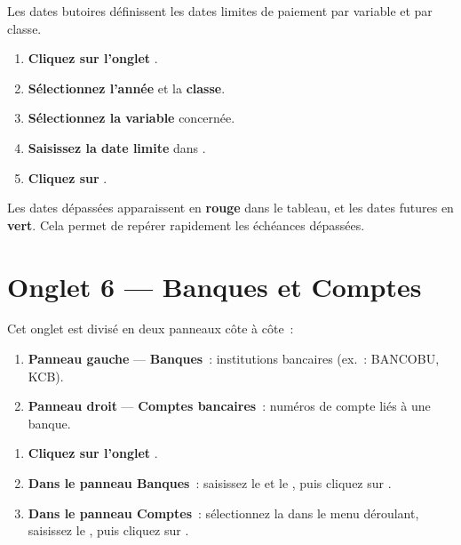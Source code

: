 Les dates butoires d\'efinissent les dates limites de paiement par variable et par classe.

\begin{etape}[title=Proc\'edure : D\'efinir une date butoire]
\begin{enumerate}[leftmargin=1.5cm,label=\textbf{\arabic*.},itemsep=10pt]
  \item \textbf{Cliquez sur l'onglet} .
  \item \textbf{S\'electionnez l'ann\'ee} et la \textbf{classe}.
  \item \textbf{S\'electionnez la variable} concern\'ee.
  \item \textbf{Saisissez la date limite} dans .
  \item \textbf{Cliquez sur} .
\end{enumerate}
\end{etape}

\begin{info}
Les dates d\'epass\'ees apparaissent en \textcolor{rose}{\textbf{rouge}} dans le tableau, et les dates futures en \textcolor{emerald}{\textbf{vert}}. Cela permet de rep\'erer rapidement les \'ech\'eances d\'epass\'ees.
\end{info}

\section{Onglet 6 --- Banques et Comptes}

Cet onglet est divis\'e en deux panneaux c\^ote \`a c\^ote~:

\begin{enumerate}[leftmargin=1.2cm]
  \item \textbf{Panneau gauche} --- \textbf{Banques}~: institutions bancaires (ex.\ : BANCOBU, KCB).
  \item \textbf{Panneau droit} --- \textbf{Comptes bancaires}~: num\'eros de compte li\'es \`a une banque.
\end{enumerate}

\begin{etape}[title=Proc\'edure : Ajouter une banque et un compte]
\begin{enumerate}[leftmargin=1.5cm,label=\textbf{\arabic*.},itemsep=10pt]
  \item \textbf{Cliquez sur l'onglet} .
  \item \textbf{Dans le panneau Banques}~: saisissez le  et le , puis cliquez sur \bouton{+}.
  \item \textbf{Dans le panneau Comptes}~: s\'electionnez la  dans le menu d\'eroulant, saisissez le , puis cliquez sur \bouton{+}.
\end{enumerate}
\end{etape}

